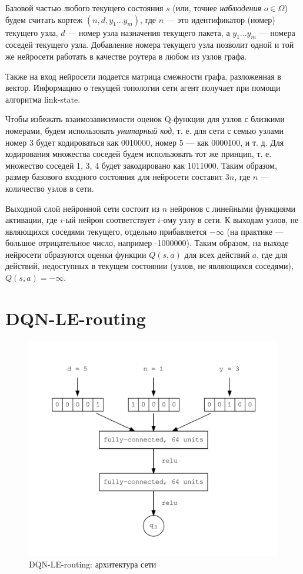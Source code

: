\documentclass[specification,annotation,times]{itmo-student-thesis}
\theoremstyle{definition}
\begin{document}
Базовой частью любого текущего состояния $s$ (или, точнее \textit{наблюдения}
$o \in \Omega$) будем считать кортеж $(n, d, y_1 ... y_m)$, где $n$ --- это
идентификатор (номер) текущего узла, $d$ --- номер узла назначения текущего
пакета, а $y_1 ... y_m$ --- номера соседей текущего узла. Добавление номера
текущего узла позволит одной и той же нейросети работать в качестве роутера в
любом из узлов графа.

Также на вход нейросети подается матрица смежности графа, разложенная в вектор.
Информацию о текущей топологии сети агент получает при помощи алгоритма link-state.

Чтобы избежать взаимозависимости оценок Q-функции для узлов с близкими номерами, будем
использовать \textit{унитарный код}, т. е. для сети с семью узлами номер 3 будет
кодироваться как 0010000, номер 5 --- как 0000100, и т. д. Для кодирования
множества соседей будем использовать тот же принцип, т. е. множество соседей 1,
3, 4 будет закодировано как 1011000. Таким образом, размер базового входного
состояния для нейросети составит $3n$, где $n$ --- количество узлов в сети.

Выходной слой нейронной сети состоит из $n$
нейронов с линейными функциями активации, где $i$-ый нейрон
соответствует $i$-ому узлу в сети. К выходам узлов, не являющихся соседями
текущего, отдельно прибавляется $-\infty$ (на практике --- большое отрицательное
число, например -1000000). Таким образом, на выходе нейросети образуются оценки
функции $Q(s, a)$ для всех действий $a$, где для действий, недоступных в текущем
состоянии (узлов, не являющихся соседями), $Q(s, a) = -\infty$.

\section{DQN-LE-routing}

\begin{figure}[!h]
  \caption{DQN-LE-routing: архитектура сети}\label{nn-1-one-out}
  \centering
  \includegraphics[scale=0.5]{nn-1-one-out}
\end{figure}
\end{document}
